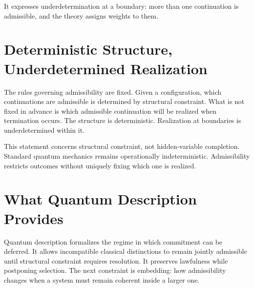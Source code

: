 \documentclass[11pt,twoside,openright]{book}
\begin{document}
It expresses underdetermination at a boundary: more than one continuation is admissible, and the theory assigns weights to them.

\section*{Deterministic Structure, Underdetermined Realization}

The rules governing admissibility are fixed. Given a configuration, which continuations are admissible is determined by structural constraint. What is not fixed in advance is which admissible continuation will be realized when termination occurs. The structure is deterministic. Realization at boundaries is underdetermined within it.

This statement concerns structural constraint, not hidden-variable completion. Standard quantum mechanics remains operationally indeterministic. Admissibility restricts outcomes without uniquely fixing which one is realized.

\section*{What Quantum Description Provides}

Quantum description formalizes the regime in which commitment can be deferred. It allows incompatible classical distinctions to remain jointly admissible until structural constraint requires resolution. It preserves lawfulness while postponing selection. The next constraint is embedding: how admissibility changes when a system must remain coherent inside a larger one.
\end{document}
